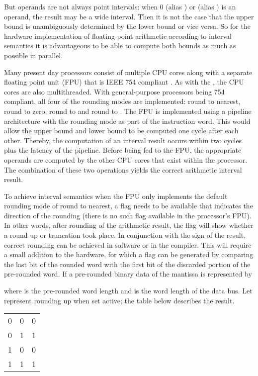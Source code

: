 \documentclass[11pt]{article}
\begin{document}
But operands are not always point intervals: when 0 (alias ) or
 (alias ) is an operand, the result may be a
wide interval. Then it is not the case that the upper bound is
unambiguously determined by the lower bound or vice versa. So for the
hardware implementation of floating-point arithmetic according to
interval semantics it is advantageous to be able to compute both
bounds as much as possible in parallel.

Many present day processors consist of multiple CPU cores along with a
separate floating point unit (FPU) that is IEEE 754 compliant
\cite{armfpu,osparc}. As with the \cite{osparc}, the CPU cores are
also multithreaded. With general-purpose processors being 754
compliant, all four of the rounding modes are implemented: round to
nearest, round to zero, round to  and round to . The
FPU is implemented using a pipeline architecture with the rounding
mode as part of the instruction word. This would allow the upper bound
and lower bound to be computed one cycle after each other. Thereby,
the computation of an interval result occurs within two cycles plus
the latency of the pipeline.  Before being fed to the FPU, the
appropriate operands are computed by the other CPU cores that exist
within the processor. The combination of these two operations yields
the correct arithmetic interval result.

To achieve interval semantics when the FPU only implements the
default rounding mode of round to nearest, a flag needs to be
available that indicates the direction of the rounding (there is no such
flag available in the processor's FPU).  In other words, after
rounding of the arithmetic result, the flag will show whether a round up
or truncation took place. In conjunction with the sign of the result,
correct rounding can be achieved in software or in the compiler. This
will require a small addition to the hardware, for which a flag can be
generated by comparing the last bit of the rounded word with the first
bit of the discarded portion of the pre-rounded word. If a pre-rounded
binary data of the mantissa is represented by

where  is the pre-rounded word length and  is the word length
of the data bus. Let  represent rounding up when set
active; the table below describes the result.
\vspace{.1in}
\begin{center}
\begin{tabular}{c | c || c }
	 &  &  \\ \hline
	0 & 0 & 0 \\
	0 & 1 & 1 \\
	1 & 0 & 0 \\
	1 & 1 & 1\\
\end{tabular}

\end{center}
\end{document}
